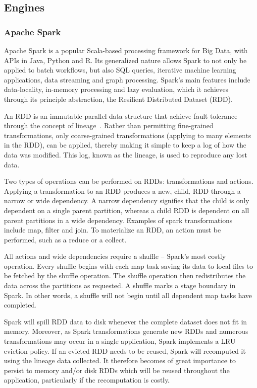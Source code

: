 \documentclass{IEEEtran}
\begin{document}
\subsection{Engines} %

\subsubsection{Apache Spark}

Apache Spark is a popular Scala-based processing framework for Big Data, with
APIs in Java, Python and R. Its 
generalized nature allows Spark to not only be applied to batch workflows,
but also SQL queries, iterative machine learning applications, 
data streaming and graph processing. Spark's
main features include data-locality, in-memory processing and lazy evaluation,
which it achieves through its principle abstraction, the Resilient Distributed 
Dataset (RDD). 

An RDD is an immutable parallel data structure that achieve fault-tolerance 
through the concept of lineage~\cite{RDDpaper}. Rather than permitting
fine-grained transformations, only coarse-grained transformations (applying to
many elements in the RDD), can be applied, thereby making it simple to keep a 
log of how the data was modified. This log, known as the lineage, is used
to reproduce any lost data.

Two types of operations can be performed on RDDs:
transformations and actions. Applying a transformation to an RDD produces a new,
child, RDD through a narrow or wide dependency. A narrow dependency signifies 
that the child is only dependent on a single parent partition, whereas a child 
RDD is dependent on all parent partitions in a wide dependency. Examples of 
spark transformations include map, filter and join. To materialize an RDD, an
action must be performed, such as a reduce or a collect.

All actions and wide dependencies require a shuffle -- Spark's most costly
operation. Every shuffle begins with each map task saving its data to local
files to be fetched by the shuffle operation. The shuffle operation then 
redistributes the data across the partitions as requested. A shuffle marks a 
stage boundary in Spark. In other words, a shuffle will not begin until all 
dependent map tasks have completed.

Spark will spill RDD data to disk whenever the complete dataset does not fit in
memory. Moreover, as Spark transformations generate new RDDs and numerous 
transformations may occur in a single application, Spark implements a LRU eviction
policy. If an evicted RDD needs to be reused, Spark will recomputed it using the
lineage data collected. It therefore becomes of great importance to persist to
memory and/or 
disk RDDs which will be reused throughout the application, particularly if the
recomputation is costly. 
\end{document}
